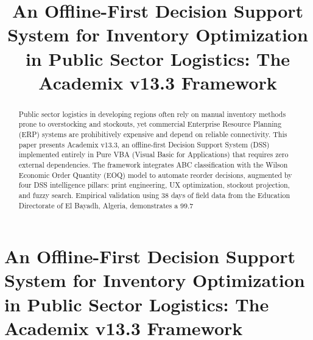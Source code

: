 ﻿\documentclass[conference]{IEEEtran}
\begin{document}
\title{An Offline-First Decision Support System for Inventory Optimization in Public Sector Logistics: The Academix v13.3 Framework}

\author{
}

\maketitle

\begin{abstract}
Public sector logistics in developing regions often rely on manual inventory methods prone to overstocking and stockouts, yet commercial Enterprise Resource Planning (ERP) systems are prohibitively expensive and depend on reliable connectivity. This paper presents Academix v13.3, an offline-first Decision Support System (DSS) implemented entirely in Pure VBA (Visual Basic for Applications) that requires zero external dependencies. The framework integrates ABC classification with the Wilson Economic Order Quantity (EOQ) model to automate reorder decisions, augmented by four DSS intelligence pillars: print engineering, UX optimization, stockout projection, and fuzzy search. Empirical validation using 38 days of field data from the Education Directorate of El Bayadh, Algeria, demonstrates a 99.7%
\end{abstract}

\begin{IEEEkeywords}

\end{IEEEkeywords}

\section{An Offline-First Decision Support System for Inventory
Optimization in Public Sector Logistics: The Academix v13.3
Framework}\label{an-offline-first-decision-support-system-for-inventory-optimization-in-public-sector-logistics-the-academix-v13.3-framework}
\end{document}
